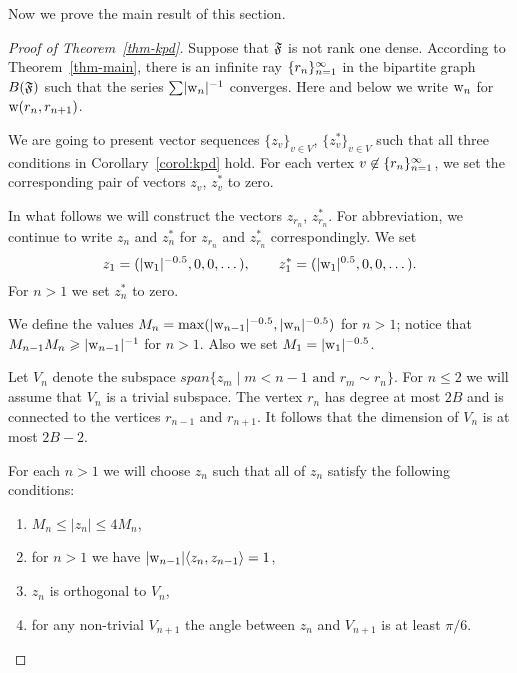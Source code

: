 \documentclass[12pt,oneside,a4paper]{amsart}
\begin{document}
      Now we prove the main result of this section.
      \begin{proof}[Proof of Theorem~\ref{thm-kpd}]
        Suppose that $\mathfrak{F}$ is not rank one dense.
        According to Theorem~\ref{thm-main}, there is an infinite ray $\{{r}_n\}_{n=1}^\infty$ in the bipartite
          graph $B(\mathfrak{F})$ such that the series $\sum\lvert\mathrm{w}_n\rvert^{-1}$ converges.
        Here and below we write $\mathrm{w}_n$ for $\mathrm{w}(r_n, r_{n + 1})$.

        We are going to present vector sequences $\{z_v\}_{v \in V}$, $\{z^*_v\}_{v \in V}$ such that all three conditions in Corollary~\ref{corol:kpd} hold.
        For each vertex $v \not \in \{{r}_n\}_{n=1}^\infty$,
          we set the corresponding pair of vectors $z_v$, $z^*_v$ to zero.

        In what follows we will construct the vectors $z_{r_n}$, $z_{r_n}^*$.
        For abbreviation, we continue to write $z_n$ and $z_n^*$ for $z_{r_n}$ and $z_{r_n}^*$ correspondingly.
        We set
        \[
          z_1=(\lvert\mathrm{w}_1\rvert^{-0.5}, 0, 0, \dots), \qquad z^*_1 = (\lvert\mathrm{w}_1\rvert^{0.5}, 0, 0, \dots).
        \]
        For $n > 1$ we set $z^*_n$ to zero.

        We define the values $M_n = \max(\lvert\mathrm{w}_{n-1}\rvert^{-0.5}, \lvert\mathrm{w}_n\rvert^{-0.5})$
          for $n > 1$; notice that $M_{n - 1} M_n \geqslant \lvert\mathrm{w}_{n - 1}\rvert^{-1}$ for $n > 1$.
        Also we set $M_1 = \lvert\mathrm{w}_1\rvert^{-0.5}$.

        Let $V_n$ denote the subspace $span\{z_m \mid m < n - 1 \text{ and } r_m \sim r_n\}$.
        For $n \leq 2$ we will assume that $V_n$ is a trivial subspace.
        The vertex $r_n$ has degree at most $2B$ and is connected to the vertices $r_{n-1}$ and $r_{n+1}$.
        It follows that the dimension of $V_n$ is at most $2B - 2$.

        For each $n > 1$ we will choose $z_n$ such that all of $z_n$ satisfy the following conditions:
        \begin{enumerate}[label=\textup{(\alph*)}]
          \item \label{kpd:c1} $M_n \leq \lvert z_n \rvert \leq 4 M_n$,
          \item \label{kpd:c2} for $n > 1$ we have $\lvert\mathrm{w}_{n-1}\rvert\langle z_n, z_{n - 1} \rangle = 1$,
          \item \label{kpd:c3} $z_n$ is orthogonal to $V_n$,
          \item \label{kpd:c4} for any non-trivial $V_{n + 1}$ the angle between $z_n$ and $V_{n + 1}$
              is at least $\pi/6$.
        \end{enumerate}


\end{proof}
\end{document}
